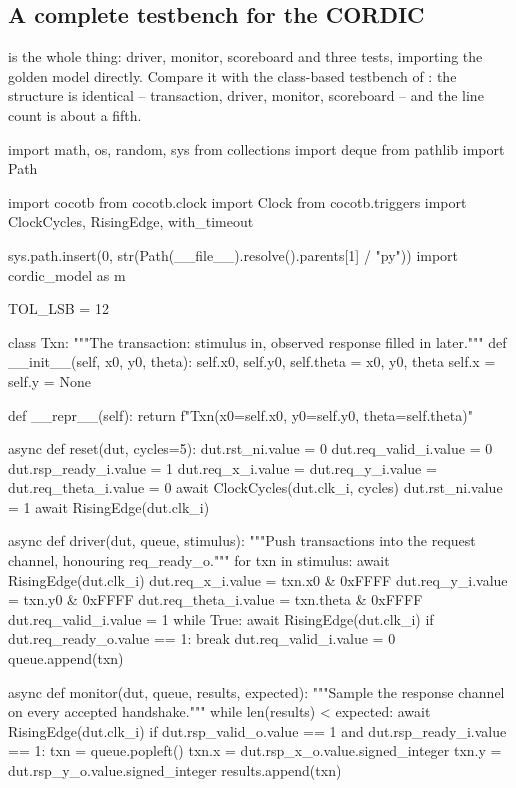 \subsection{A complete testbench for the CORDIC}

 is the whole thing: driver, monitor, scoreboard
and three tests, importing the golden model directly. Compare it with the
class-based \SV{} testbench of : the structure is identical --
transaction, driver, monitor, scoreboard -- and the line count is about a
fifth.

\begin{pycode}[caption={A complete cocotb testbench for \code{cordic\_rot}
(\file{test\_cordic.py}).},label={lst:python:cocotbtb}]
import math, os, random, sys
from collections import deque
from pathlib import Path

import cocotb
from cocotb.clock import Clock
from cocotb.triggers import ClockCycles, RisingEdge, with_timeout

sys.path.insert(0, str(Path(__file__).resolve().parents[1] / "py"))
import cordic_model as m

TOL_LSB = 12


class Txn:
    """The transaction: stimulus in, observed response filled in later."""
    def __init__(self, x0, y0, theta):
        self.x0, self.y0, self.theta = x0, y0, theta
        self.x = self.y = None

    def __repr__(self):
        return f"Txn(x0={self.x0}, y0={self.y0}, theta={self.theta})"


async def reset(dut, cycles=5):
    dut.rst_ni.value = 0
    dut.req_valid_i.value = 0
    dut.rsp_ready_i.value = 1
    dut.req_x_i.value = dut.req_y_i.value = dut.req_theta_i.value = 0
    await ClockCycles(dut.clk_i, cycles)
    dut.rst_ni.value = 1
    await RisingEdge(dut.clk_i)


async def driver(dut, queue, stimulus):
    """Push transactions into the request channel, honouring req_ready_o."""
    for txn in stimulus:
        await RisingEdge(dut.clk_i)
        dut.req_x_i.value = txn.x0 & 0xFFFF
        dut.req_y_i.value = txn.y0 & 0xFFFF
        dut.req_theta_i.value = txn.theta & 0xFFFF
        dut.req_valid_i.value = 1
        while True:
            await RisingEdge(dut.clk_i)
            if dut.req_ready_o.value == 1:
                break
        dut.req_valid_i.value = 0
        queue.append(txn)


async def monitor(dut, queue, results, expected):
    """Sample the response channel on every accepted handshake."""
    while len(results) < expected:
        await RisingEdge(dut.clk_i)
        if dut.rsp_valid_o.value == 1 and dut.rsp_ready_i.value == 1:
            txn = queue.popleft()
            txn.x = dut.rsp_x_o.value.signed_integer
            txn.y = dut.rsp_y_o.value.signed_integer
            results.append(txn)



\end{pycode}
